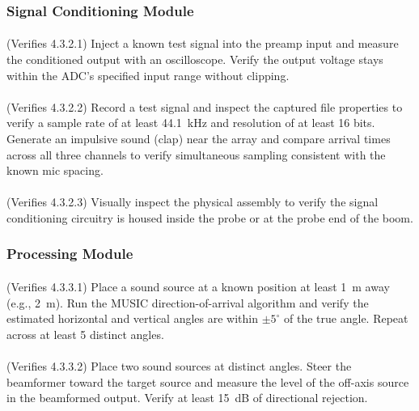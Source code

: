 \subsubsection{Signal Conditioning Module}

\paragraph{}
(Verifies 4.3.2.1) Inject a known test signal into the preamp input and measure the conditioned output with an oscilloscope.  Verify the output voltage stays within the ADC's specified input range without clipping.

\paragraph{}
(Verifies 4.3.2.2) Record a test signal and inspect the captured file properties to verify a sample rate of at least 44.1~kHz and resolution of at least 16 bits.  Generate an impulsive sound (clap) near the array and compare arrival times across all three channels to verify simultaneous sampling consistent with the known mic spacing.

\paragraph{}
(Verifies 4.3.2.3) Visually inspect the physical assembly to verify the signal conditioning circuitry is housed inside the probe or at the probe end of the boom.

\subsubsection{Processing Module}

\paragraph{}
(Verifies 4.3.3.1) Place a sound source at a known position at least 1~m away (e.g., 2~m).  Run the MUSIC direction-of-arrival algorithm and verify the estimated horizontal and vertical angles are within $\pm 5^{\circ}$ of the true angle.  Repeat across at least 5 distinct angles.

\paragraph{}
(Verifies 4.3.3.2) Place two sound sources at distinct angles.  Steer the beamformer toward the target source and measure the level of the off-axis source in the beamformed output.  Verify at least 15~dB of directional rejection.

